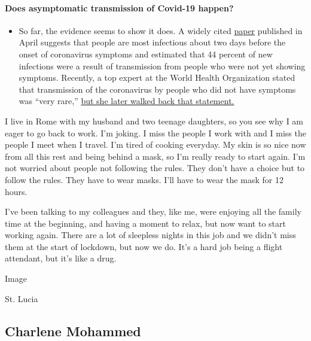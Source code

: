\begin{itemize}
{  \paragraph{Does asymptomatic transmission of Covid-19
  happen?}\label{does-asymptomatic-transmission-of-covid-19-happen}}

  \begin{itemize}
  \tightlist
  \item
    So far, the evidence seems to show it does. A widely cited
    \href{https://www.nature.com/articles/s41591-020-0869-5}{paper}
    published in April suggests that people are most infectious about
    two days before the onset of coronavirus symptoms and estimated that
    44 percent of new infections were a result of transmission from
    people who were not yet showing symptoms. Recently, a top expert at
    the World Health Organization stated that transmission of the
    coronavirus by people who did not have symptoms was ``very rare,''
    \href{https://www.nytimes.com/2020/06/09/world/coronavirus-updates.html?action=click\&pgtype=Article\&state=default\&region=MAIN_CONTENT_3\&context=storylines_faq\#link-1f302e21}{but
    she later walked back that statement.}
  \end{itemize}
\end{itemize}

I live in Rome with my husband and two teenage daughters, so you see why
I am eager to go back to work. I'm joking. I miss the people I work with
and I miss the people I meet when I travel. I'm tired of cooking
everyday. My skin is so nice now from all this rest and being behind a
mask, so I'm really ready to start again. I'm not worried about people
not following the rules. They don't have a choice but to follow the
rules. They have to wear masks. I'll have to wear the mask for 12 hours.

I've been talking to my colleagues and they, like me, were enjoying all
the family time at the beginning, and having a moment to relax, but now
want to start working again. There are a lot of sleepless nights in this
job and we didn't miss them at the start of lockdown, but now we do.
It's a hard job being a flight attendant, but it's like a drug.

Image

St. Lucia

\hypertarget{charlene-mohammed}{%
\subsection{Charlene Mohammed}\label{charlene-mohammed}}

